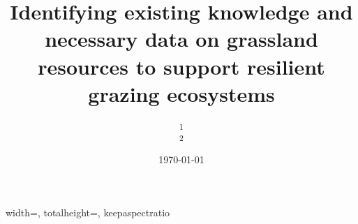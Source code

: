 \title{Identifying existing knowledge and necessary data on grassland resources to support resilient grazing ecosystems} %

\newcommand{\ShortTitle}{Grassland resources \& grazing ecosystems}
\let\runtitle\ShortTitle

\author{
	\newline\newline %
	\textsuperscript{1}
	\\ 
	\textsuperscript{2}
	\\ 
}

\date{\today} 

%
%

\usepackage{kantlipsum}

\usepackage{multicol}

\usepackage[svgnames]{xcolor} 

\usepackage{transparent}

\usepackage{longtable, 	lscape}
	\setlength{\LTleft}{0pt}
\usepackage{typearea}
\usepackage{setspace}
\usepackage[
colorlinks=true, 
allcolors = {BisonGreen}]{hyperref}
\usepackage{indentfirst}

\setcounter{secnumdepth}{-2} %
\usepackage[titletoc, title]{appendix} %

\usepackage[utf8]{inputenc} 
\usepackage[T1]{fontenc}

\renewcommand{\familydefault}{\sfdefault}
\usepackage{epigrafica}

\usepackage{graphicx} 
\graphicspath{{figures/}}
	{width=\linewidth,
	totalheight=\textheight,
	keepaspectratio}

\newcommand*{\plogo}{\texttt{[image: NDSURangeScience.pdf]}} 

\newcommand*{\R}{\textup{\textmd{\textsf{R{ }}}}}
\newcommand*{\sw}[1]{\texttt{\textrm{#1}}}

\usepackage[english]{babel} %
\addto{\captionsenglish}
	{\renewcommand{\abstractname}
	{\textcolor{BisonYellow}
	{Summary}}}
\usepackage{microtype} %
\usepackage{chngcntr} %
\usepackage[footnotesize,
			labelfont=bf, 
			up]			
		{caption} %

